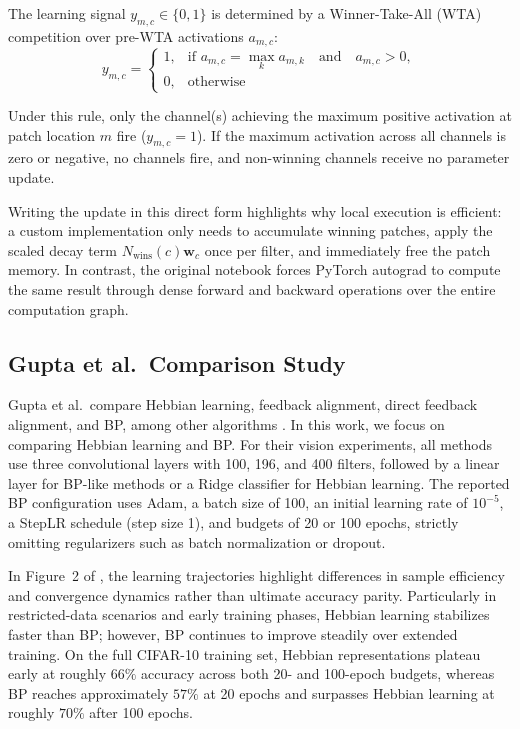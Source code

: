 \documentclass{article}
\begin{document}
The learning signal $y_{m,c} \in \{0, 1\}$ is determined by a Winner-Take-All (WTA) competition over pre-WTA activations $a_{m,c}$:
\begin{equation}
    y_{m,c} = 
    \begin{cases} 
    1, & \text{if } a_{m,c} = \max_{k} a_{m,k} \quad \text{and} \quad a_{m,c} > 0, \\ 
    0, & \text{otherwise} 
    \end{cases}
\label{eq:wta}
\end{equation}

Under this rule, only the channel(s) achieving the maximum positive activation at patch location $m$ fire ($y_{m,c} = 1$). If the maximum activation across all channels is zero or negative, no channels fire, and non-winning channels receive no parameter update.

Writing the update in this direct form highlights why local execution is efficient: a custom implementation only needs to accumulate winning patches, apply the scaled decay term $N_{\text{wins}}(c)\mathbf{w}_c$ once per filter, and immediately free the patch memory. In contrast, the original notebook forces PyTorch autograd to compute the same result through dense forward and backward operations over the entire computation graph.

    \subsection{Gupta et al.\ Comparison Study}
    
    Gupta et al.\ compare Hebbian learning, feedback alignment, direct feedback alignment, and BP, among other algorithms \citep{gupta2023bio}. In this work, we focus on comparing Hebbian learning and BP. For their vision experiments, all methods use three convolutional layers with 100, 196, and 400 filters, followed by a linear layer for BP-like methods or a Ridge classifier for Hebbian learning. The reported BP configuration uses Adam, a batch size of 100, an initial learning rate of $10^{-5}$, a StepLR schedule (step size 1), and budgets of 20 or 100 epochs, strictly omitting regularizers such as batch normalization or dropout.

In Figure~2 of \citet{gupta2023bio}, the learning trajectories highlight differences in sample efficiency and convergence dynamics rather than ultimate accuracy parity. Particularly in restricted-data scenarios and early training phases, Hebbian learning stabilizes faster than BP; however, BP continues to improve steadily over extended training. On the full CIFAR-10 training set, Hebbian representations plateau early at roughly $66\%$ accuracy across both 20- and 100-epoch budgets, whereas BP reaches approximately $57\%$ at 20 epochs and surpasses Hebbian learning at roughly $70\%$ after 100 epochs.
\end{document}

